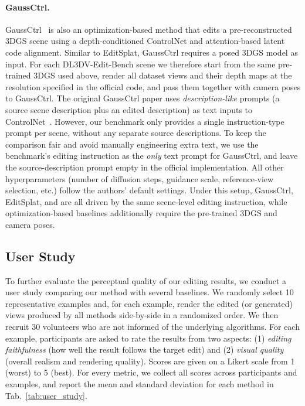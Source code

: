 \paragraph{GaussCtrl.}
GaussCtrl~\cite{gaussctrl} is also an optimization-based method that edits a pre-reconstructed 3DGS scene using a depth-conditioned ControlNet and attention-based latent code alignment.
Similar to EditSplat, GaussCtrl requires a posed 3DGS model as input.
For each DL3DV-Edit-Bench scene we therefore start from the same pre-trained 3DGS used above, render all dataset views and their depth maps at the resolution specified in the official code, and pass them together with camera poses to GaussCtrl.
The original GaussCtrl paper uses \emph{description-like} prompts (a source scene description plus an edited description) as text inputs to ControlNet~\cite{gaussctrl,lee2025editsplatmultiviewfusionattentionguided}.
However, our benchmark only provides a single instruction-type prompt per scene, without any separate source descriptions.
To keep the comparison fair and avoid manually engineering extra text, we use the benchmark’s editing instruction as the \emph{only} text prompt for GaussCtrl, and leave the source-description prompt empty in the official implementation.
All other hyperparameters (number of diffusion steps, guidance scale, reference-view selection, etc.) follow the authors’ default settings.
Under this setup, GaussCtrl, EditSplat, and {\ourmethod} are all driven by the same scene-level editing instruction, while optimization-based baselines additionally require the pre-trained 3DGS and camera poses.

\subsection{User Study}
To further evaluate the perceptual quality of our editing results, we conduct a user study comparing our method with several baselines. We randomly select 10 representative examples and, for each example, render the edited (or generated) views produced by all methods side-by-side in a randomized order. We then recruit 30 volunteers who are not informed of the underlying algorithms. For each example, participants are asked to rate the results from two aspects: (1) \emph{editing faithfulness} (how well the result follows the target edit) and (2) \emph{visual quality} (overall realism and rendering quality). Scores are given on a Likert scale from 1 (worst) to 5 (best). For every metric, we collect all scores across participants and examples, and report the mean and standard deviation for each method in Tab.~\ref{tab:user_study}.


